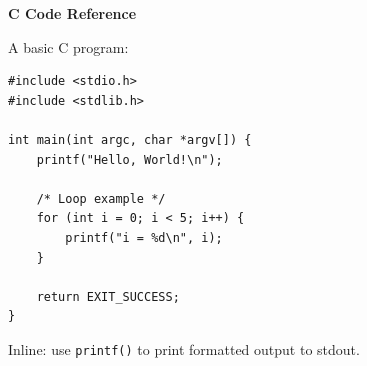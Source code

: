 \documentclass[11pt]{article}
\begin{document}
\centerline{\Large\bf C Code Reference}\par
\bigskip

A basic C program:

\begin{lstlisting}
#include <stdio.h>
#include <stdlib.h>

int main(int argc, char *argv[]) {
    printf("Hello, World!\n");

    /* Loop example */
    for (int i = 0; i < 5; i++) {
        printf("i = %d\n", i);
    }

    return EXIT_SUCCESS;
}
\end{lstlisting}

Inline: use \lstinline{printf()} to print formatted output to stdout.
\end{document}

